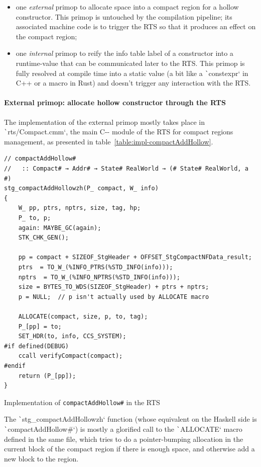 \documentclass[english]{jflart}
\begin{document}
\begin{itemize}
\item one \emph{external} primop to allocate space into a compact region for a hollow constructor. This primop is untouched by the compilation pipeline; its associated machine code is to trigger the RTS so that it produces an effect on the compact region;
\item one \emph{internal} primop to reify the info table label of a constructor into a runtime-value that can be communicated later to the RTS. This primop is fully resolved at compile time into a static value (a bit like a \texttt`constexpr` in C++ or a macro in Rust) and doesn't trigger any interaction with the RTS.
\end{itemize}

\paragraph{External primop: allocate hollow constructor through the RTS}

The implementation of the external primop mostly takes place in \texttt`rts/Compact.cmm`, the main C-{}- module of the RTS for compact regions management, as presented in table~\ref{table:impl-compactAddHollow}.

\begin{table}[t]
\small
\begin{verbatim}
// compactAddHollow#
//   :: Compact# → Addr# → State# RealWorld → (# State# RealWorld, a #)
stg_compactAddHollowzh(P_ compact, W_ info)
{
    W_ pp, ptrs, nptrs, size, tag, hp;
    P_ to, p;
    again: MAYBE_GC(again);
    STK_CHK_GEN();

    pp = compact + SIZEOF_StgHeader + OFFSET_StgCompactNFData_result;
    ptrs  = TO_W_(%INFO_PTRS(%STD_INFO(info)));
    nptrs  = TO_W_(%INFO_NPTRS(%STD_INFO(info)));
    size = BYTES_TO_WDS(SIZEOF_StgHeader) + ptrs + nptrs;
    p = NULL;  // p isn't actually used by ALLOCATE macro

    ALLOCATE(compact, size, p, to, tag);
    P_[pp] = to;
    SET_HDR(to, info, CCS_SYSTEM);
#if defined(DEBUG)
    ccall verifyCompact(compact);
#endif
    return (P_[pp]);
}
\end{verbatim}
\caption{Implementation of \texttt{compactAddHollow\#} in the RTS}
\label{table:impl-compactAddHollow}
\end{table}

The \texttt`stg_compactAddHollowzh` function (whose equivalent on the Haskell side is \texttt`compactAddHollow#`) is mostly a glorified call to the \texttt`ALLOCATE` macro defined in the same file, which tries to do a pointer-bumping allocation in the current block of the compact region if there is enough space, and otherwise add a new block to the region.
\end{document}
